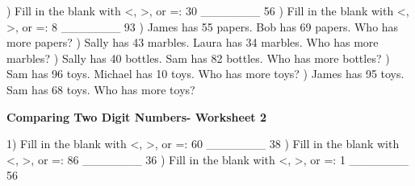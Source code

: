 \documentclass{article}%
\begin{document}
\newline%
\newline%
) Fill in the blank with <, >, or =: 30 \_\_\_\_\_\_\_ 56%
\newline%
\newline%
) Fill in the blank with <, >, or =: 8 \_\_\_\_\_\_\_ 93%
\newline%
\newline%
) James has 55 papers. Bob has 69 papers. Who has more papers?%
\newline%
\newline%
) Sally has 43 marbles. Laura has 34 marbles. Who has more marbles?%
\newline%
\newline%
) Sally has 40 bottles. Sam has 82 bottles. Who has more bottles?%
\newline%
\newline%
) Sam has 96 toys. Michael has 10 toys. Who has more toys?%
\newline%
\newline%
) James has 95 toys. Sam has 68 toys. Who has more toys?%
\newline%
\newline%
\newline%
\pagebreak%
\large%
\begin{center}%
\textbf{Comparing Two Digit Numbers- Worksheet 2}%
\newline%
\newline%
\newline%
\end{center} \normalsize%
1) Fill in the blank with <, >, or =: 60 \_\_\_\_\_\_\_ 38%
\newline%
\newline%
) Fill in the blank with <, >, or =: 86 \_\_\_\_\_\_\_ 36%
\newline%
\newline%
) Fill in the blank with <, >, or =: 1 \_\_\_\_\_\_\_ 56%
\newline%
\newline%
\newline%
\end{document}
